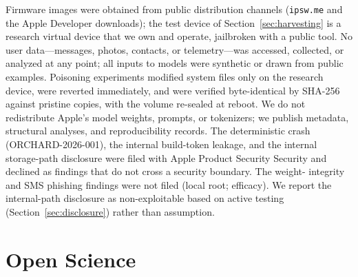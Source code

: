\documentclass[letterpaper,twocolumn,10pt]{article}
\begin{document}
Firmware images were obtained from public distribution channels
(\texttt{ipsw.me} and the Apple Developer downloads); the test device of
Section~\ref{sec:harvesting} is a research virtual device that we own and
operate, jailbroken with a public tool. No user data---messages, photos, contacts, or telemetry---was
accessed, collected, or analyzed at any point; all inputs to models were
synthetic or drawn from public examples.
Poisoning experiments modified system files only on the research device,
were reverted immediately, and were verified byte-identical by SHA-256
against pristine copies, with the volume re-sealed at reboot.
We do not redistribute Apple's model weights, prompts, or tokenizers; we
publish metadata, structural analyses, and reproducibility records.
The deterministic crash (ORCHARD-2026-001), the internal build-token leakage,
and the internal storage-path disclosure were filed with Apple Product Security Security
and declined as findings that do not cross a security boundary. The weight-
integrity and SMS phishing findings were not filed (local root; efficacy). We
report the internal-path disclosure as non-exploitable based on active
testing (Section~\ref{sec:disclosure}) rather than assumption.

\section{Open Science}
\label{app:open}
\end{document}
